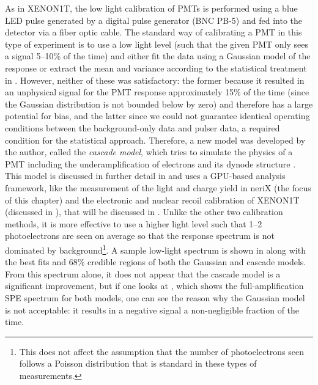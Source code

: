 As in XENON1T, the low light calibration of PMTs is performed using a blue LED pulse generated by a digital pulse generator (BNC PB-5) and fed into the detector via a fiber optic cable.  The standard way of calibrating a PMT in this type of experiment is to use a low light level (such that the given PMT only sees a signal 5--10\% of the time) and either fit the data using a Gaussian model of the response or extract the mean and variance according to the statistical treatment in .  However, neither of these was satisfactory: the former because it resulted in an unphysical signal for the PMT response approximately 15\% of the time (since the Gaussian distribution is not bounded below by zero) and therefore has a large potential for bias, and the latter since we could not guarantee identical operating conditions between the background-only data and pulser data, a required condition for the statistical approach.  Therefore, a new model was developed by the author, called the \textit{cascade model}, which tries to simulate the physics of a PMT including the underamplification of electrons and its dynode structure \cite{anthony2017characterization}.  This model is discussed in further detail in  and uses a GPU-based analysis framework, like the measurement of the light and charge yield in neriX (the focus of this chapter) and the electronic and nuclear recoil calibration of XENON1T (discussed in ), that will be discussed in .  Unlike the other two calibration methods, it is more effective to use a higher light level such that 1--2 photoelectrons are seen on average so that the response spectrum is not dominated by background\footnote{This does not affect the assumption that the number of photoelectrons seen follows a Poisson distribution that is standard in these types of measurements.}.  A sample low-light spectrum is shown in  along with the best fits and 68\% credible regions of both the Gaussian and cascade models.  From this spectrum alone, it does not appear that the cascade model is a significant improvement, but if one looks at , which shows the full-amplification SPE spectrum for both models, one can see the reason why the Gaussian model is not acceptable: it results in a negative signal a non-negligible fraction of the time.


